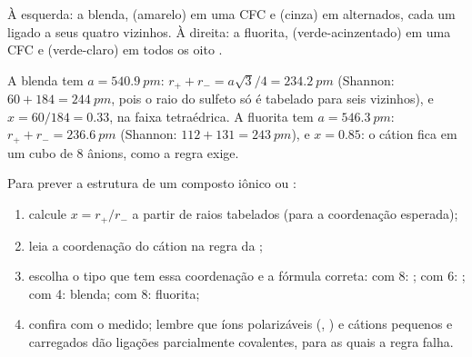 \begin{omfigure}

{\small À esquerda: a blenda,  (amarelo) em uma  CFC e
 (cinza) em  alternados, cada um ligado a
seus quatro vizinhos. À direita: a fluorita,  (verde-acinzentado)
em uma  CFC e  (verde-claro) em todos os oito .}
\end{omfigure}

\begin{example}\label{ex:b1:crystals-ionic-covalent:zns}
A blenda tem $a = \qty{540.9}{pm}$: $r_+ + r_- = a\sqrt3/4 =
\qty{234.2}{pm}$ (Shannon: $60 + 184 = \qty{244}{pm}$, pois o raio do
sulfeto só é tabelado para seis vizinhos), e $x = 60/184 = 0.33$, na
faixa tetraédrica. A fluorita tem $a = \qty{546.3}{pm}$: $r_+ + r_- =
\qty{236.6}{pm}$ (Shannon: $112 + 131 = \qty{243}{pm}$), e $x = 0.85$: o
cátion fica em um cubo de 8 ânions, como a regra exige.
\end{example}

\begin{method}\label{met:b1:crystals-ionic-covalent:predict}
Para prever a estrutura de um composto iônico  ou :
\begin{enumerate}
  \item calcule $x = r_+/r_-$ a partir de raios tabelados (para a
        coordenação esperada);
  \item leia a coordenação do cátion na regra da ;
  \item escolha o tipo que tem essa coordenação e a fórmula correta:
         com 8: ; com 6: ; com 4: blenda;
         com 8: fluorita;
  \item confira com o  medido; lembre que íons
        polarizáveis (, ) e cátions pequenos e
        carregados dão ligações parcialmente covalentes, para as quais
        a regra falha.
\end{enumerate}
\end{method}

